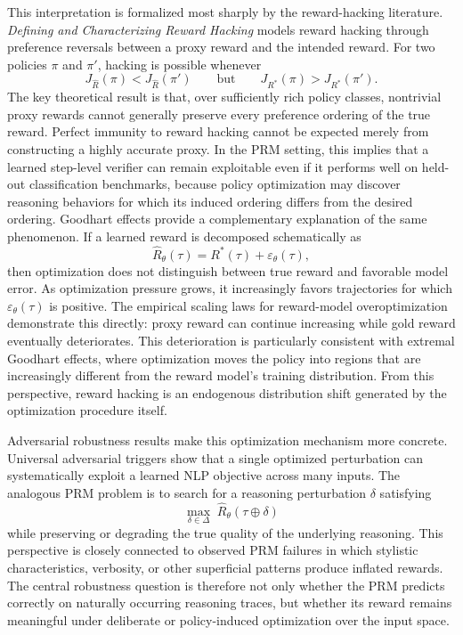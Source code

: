 \documentclass[11pt]{article}
\begin{document}
This interpretation is formalized most sharply by the reward-hacking literature. \emph{Defining and Characterizing Reward Hacking} models reward hacking through preference reversals between a proxy reward and the intended reward. For two policies $\pi$ and $\pi'$, hacking is possible whenever
\[
J_{\widehat{R}}(\pi)
<
J_{\widehat{R}}(\pi')
\qquad
\text{but}
\qquad
J_{R^{*}}(\pi)
>
J_{R^{*}}(\pi').
\]
The key theoretical result is that, over sufficiently rich policy classes, nontrivial proxy rewards cannot generally preserve every preference ordering of the true reward. Perfect immunity to reward hacking cannot be expected merely from constructing a highly accurate proxy. In the PRM setting, this implies that a learned step-level verifier can remain exploitable even if it performs well on held-out classification benchmarks, because policy optimization may discover reasoning behaviors for which its induced ordering differs from the desired ordering.
Goodhart effects provide a complementary explanation of the same phenomenon. If a learned reward is decomposed schematically as
\[
\widehat{R}_{\theta}(\tau)
=
R^{*}(\tau)
+
\varepsilon_{\theta}(\tau),
\]
then optimization does not distinguish between true reward and favorable model error. As optimization pressure grows, it increasingly favors trajectories for which $\varepsilon_{\theta}(\tau)$ is positive. The empirical scaling laws for reward-model overoptimization demonstrate this directly: proxy reward can continue increasing while gold reward eventually deteriorates. This deterioration is particularly consistent with extremal Goodhart effects, where optimization moves the policy into regions that are increasingly different from the reward model's training distribution. From this perspective, reward hacking is an endogenous distribution shift generated by the optimization procedure itself.

Adversarial robustness results make this optimization mechanism more concrete. Universal adversarial triggers show that a single optimized perturbation can systematically exploit a learned NLP objective across many inputs. The analogous PRM problem is to search for a reasoning perturbation $\delta$ satisfying
\[
\max_{\delta\in\Delta}
\;
\widehat{R}_{\theta}(\tau\oplus\delta)
\]
while preserving or degrading the true quality of the underlying reasoning. This perspective is closely connected to observed PRM failures in which stylistic characteristics, verbosity, or other superficial patterns produce inflated rewards. The central robustness question is therefore not only whether the PRM predicts correctly on naturally occurring reasoning traces, but whether its reward remains meaningful under deliberate or policy-induced optimization over the input space.
\end{document}
